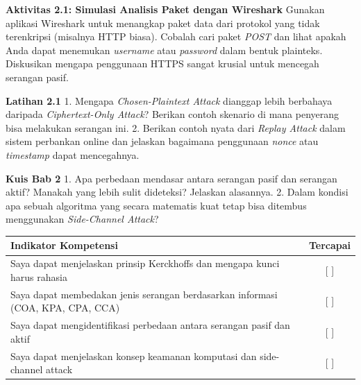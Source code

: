 \documentclass[../main.tex]{subfiles}
\begin{document}
\begin{obeactivity}
\textbf{Aktivitas 2.1: Simulasi Analisis Paket dengan Wireshark}
Gunakan aplikasi Wireshark untuk menangkap paket data dari protokol yang tidak terenkripsi (misalnya HTTP biasa). Cobalah cari paket \textit{POST} dan lihat apakah Anda dapat menemukan \textit{username} atau \textit{password} dalam bentuk plainteks. Diskusikan mengapa penggunaan HTTPS sangat krusial untuk mencegah serangan pasif.
\end{obeactivity}

\begin{obereflection}
\textbf{Latihan 2.1}
1. Mengapa \textit{Chosen-Plaintext Attack} dianggap lebih berbahaya daripada \textit{Ciphertext-Only Attack}? Berikan contoh skenario di mana penyerang bisa melakukan serangan ini.
2. Berikan contoh nyata dari \textit{Replay Attack} dalam sistem perbankan online dan jelaskan bagaimana penggunaan \textit{nonce} atau \textit{timestamp} dapat mencegahnya.
\end{obereflection}

\begin{obeassessment}
\textbf{Kuis Bab 2}
1. Apa perbedaan mendasar antara serangan pasif dan serangan aktif? Manakah yang lebih sulit dideteksi? Jelaskan alasannya.
2. Dalam kondisi apa sebuah algoritma yang secara matematis kuat tetap bisa ditembus menggunakan \textit{Side-Channel Attack}?
\end{obeassessment}

\begin{competencychecklist}
\begin{tabularx}{\linewidth}{|X|c|}
\hline
Indikator Kompetensi & Tercapai \\
\hline
Saya dapat menjelaskan prinsip Kerckhoffs dan mengapa kunci harus rahasia & [ ] \\
\hline
Saya dapat membedakan jenis serangan berdasarkan informasi (COA, KPA, CPA, CCA) & [ ] \\
\hline
Saya dapat mengidentifikasi perbedaan antara serangan pasif dan aktif & [ ] \\
\hline
Saya dapat menjelaskan konsep keamanan komputasi dan side-channel attack & [ ] \\
\hline
\end{tabularx}
\end{competencychecklist}
\end{document}
